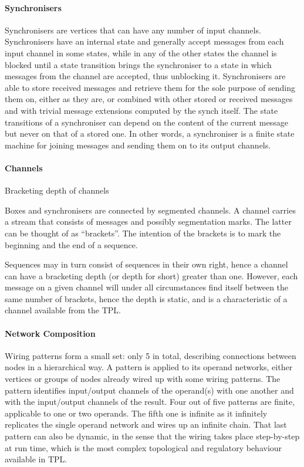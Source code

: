 \paragraph{Synchronisers}
Synchronisers are vertices that can have any number of input channels. Synchronisers have an internal state and generally accept messages from each input channel in some states, while in any of the other states the channel is blocked until a state transition brings the synchroniser to a state in which messages from the channel are accepted, thus unblocking it. Synchronisers are able to store received messages and retrieve them for the sole purpose of sending them on, either as they are, or combined with other stored or received messages and with trivial message extensions computed by the synch itself. The state transitions of a synchroniser can depend on the content of the current message but never on that of a stored one. In other words, a synchroniser is a finite state machine for joining messages and sending them on to its output channels.


\paragraph{Channels}
Bracketing depth of channels

Boxes and synchronisers are connected by segmented channels. A channel carries a stream that
consists of messages and possibly segmentation marks. The latter can be thought of as “brackets”. The intention of the brackets is to mark the beginning and the end of a sequence.

Sequences may in turn consist of sequences in their own right, hence a channel can have a bracketing depth (or depth for short) greater than one. However, each message on a given channel will under all circumstances find itself between the same number of brackets, hence the depth is static, and is a characteristic of a channel available from the TPL.


\paragraph{Network Composition}

Wiring patterns form a small set: only 5 in total, describing connections between
nodes in a hierarchical way. A pattern is applied to its operand networks, either vertices or groups of nodes already wired up with some wiring patterns. The pattern identifies input/output channels of the operand(s) with one another and with the input/output channels of the result. Four out of five patterns are finite, applicable to one or two operands. The fifth one is infinite as it infinitely replicates the single operand network and wires up an infinite chain. That last pattern can also be dynamic, in the sense that the wiring takes place step-by-step at run time, which is the most complex topological and regulatory behaviour available in TPL.

